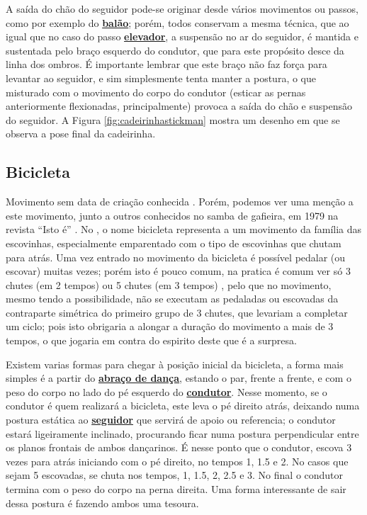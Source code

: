 A saída do chão do seguidor pode-se originar desde vários movimentos ou passos,
como por exemplo do  \hyperref[def:PassoBalao]{\textbf{balão}}; 
porém,
todos conservam a mesma técnica, que ao igual que  no caso do passo  \hyperref[def:PassoElevador]{\textbf{elevador}},
a suspensão no ar do seguidor, é mantida e sustentada pelo braço esquerdo do condutor,
que para este propósito  desce da linha dos ombros.
É importante lembrar que este braço não faz força para levantar ao seguidor, 
e sim simplesmente tenta manter a postura,
o que misturado com o movimento do corpo do condutor (esticar as pernas anteriormente flexionadas, principalmente)
provoca a saída do chão e suspensão do seguidor.
A Figura \ref{fig:cadeirinhastickman} mostra um desenho em que se observa a pose final da cadeirinha.


\subsection{Bicicleta}

Movimento sem data de criação conhecida \cite[pp. 143,144]{perna2002samba}.
Porém, podemos ver uma menção a este movimento, junto a outros conhecidos no samba de gafieira, 
em 1979 na revista ``Isto é'' \cite[pp. 89]{revista1979isto}.
No \AnoLivro, o nome bicicleta representa a um movimento da família das escovinhas,
especialmente emparentado com o tipo de escovinhas que chutam para atrás.
Uma vez entrado no movimento da bicicleta é possível pedalar (ou escovar) muitas vezes;
porém isto é pouco comum, na pratica é comum ver só 3 chutes (em 2 tempos) ou 5 chutes (em 3 tempos) ,
pelo que no movimento, mesmo tendo a possibilidade, 
não se executam as pedaladas ou escovadas da contraparte simétrica do primeiro grupo de 3 chutes,
que levariam a completar um ciclo;
pois isto obrigaria a alongar a duração do movimento a mais de 3 tempos,
o que jogaria em contra do espirito deste que é a surpresa.

Existem varias formas para chegar à posição inicial da bicicleta,  
a forma mais simples é a partir do \hyperref[def:abracodedanca]{\textbf{abraço de dança}},
estando o par, frente a frente, 
e com o peso do corpo no lado do pé esquerdo do \hyperref[def:Condutor]{\textbf{condutor}}.
Nesse momento, se o condutor é quem realizará a bicicleta, 
este leva o pé direito atrás,
deixando numa postura estática ao \hyperref[def:Seguidor]{\textbf{seguidor}} 
que servirá de apoio ou referencia;   
o condutor estará ligeiramente inclinado,
procurando ficar numa postura perpendicular entre os planos frontais de ambos dançarinos.
É nesse ponto que o condutor, escova 3 vezes para atrás iniciando com o pé direito,
no tempos 1, 1.5 e 2. No casos que sejam 5 escovadas, se chuta nos tempos,
1, 1.5, 2, 2.5 e 3. No final o condutor termina com o peso do corpo na perna direita.
Uma forma interessante de sair dessa postura é fazendo ambos uma tesoura.\\

